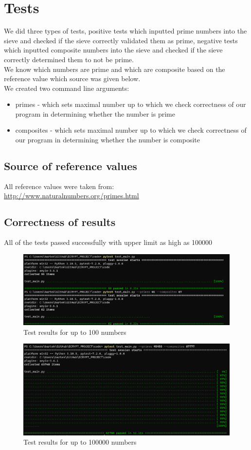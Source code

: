 \documentclass[12pt]{article}
\begin{document}
\section{Tests}
We did three types of tests, positive tests which inputted prime numbers into the sieve and checked if the sieve correctly validated them as prime, negative tests which inputted composite numbers into the sieve and checked if the sieve correctly determined them to not be prime. \\ 
We know which numbers are prime and which are composite based on the reference value which source was given below. \\ 
We created two command line arguments: 
\begin{itemize}
    \item  primes - which sets maximal number up to which we check correctness of our program in determining whether the number is prime
    \item composites - which sets maximal number up to which we check correctness of our program in determining whether the number is composite
\end{itemize}
\subsection{Source of reference values}
All reference values were taken from: \href{http://www.naturalnumbers.org/primes.html}{http://www.naturalnumbers.org/primes.html}

\subsection{Correctness of results}
All of the tests passed successfully with upper limit as high as 100000

\begin{figure}[H]
\centering
\includegraphics[width=\textwidth]
{screenshoot/tests100.png}
\caption{Test results for up to 100 numbers}

\end{figure}


\begin{figure}[H]
\centering
\includegraphics[width=\textwidth]
{screenshoot/tests100000.png}
\caption{Test results for up to 100000 numbers}

\end{figure}
\end{document}
